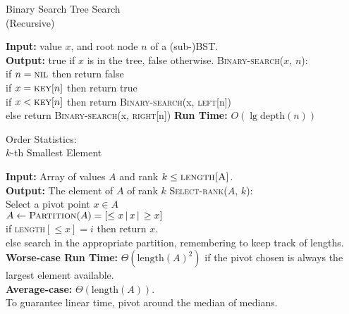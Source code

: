 \documentclass[avery5388, grid]{flashcards}
\begin{document}
\makeatletter
\renewcommand*\env@matrix[1][c]{\hskip -\arraycolsep
  \let\@ifnextchar\new@ifnextchar
  \array{*\c@MaxMatrixCols #1}}
\makeatother


\begin{flashcard}{Binary Search Tree Search\\(Recursive)}
\begin{flushleft}
\textsf{\textbf{Input:}} value $x$, and root node $n$ of a (sub-)BST.\\
\textsf{\textbf{Output:}} \textsf{true} if $x$ is in the tree, \textsf{false} otherwise.
\vskip 5pt
\textsc{Binary-search}($x$, $n$):\\
\quad if $n=\textsc{nil}$ then return \textsf{false}\\
\quad if $x=\textsc{key}[n]$ then return \textsf{true}\\
\quad if $x < \textsc{key}[n]$ then return \textsc{Binary-search}(x, \textsc{left}[n])\\
\quad else return \textsc{Binary-search}(x, \textsc{right}[n])
\vskip 5pt
\textsf{\textbf{Run Time:}} $O(\lg\mathrm{depth}(n))$
\end{flushleft}
\end{flashcard}

\begin{flashcard}{Order Statistics:\\ $k$-th Smallest Element}
\begin{flushleft}
\textsf{\textbf{Input:}} Array of values $A$ and rank $k \leq \textsc{length[A]}$.\\
\textsf{\textbf{Output:}} The element of $A$ of rank $k$
\vskip 5pt
\textsc{Select-rank}($A$, $k$):\\
\quad Select a pivot point $x \in A$\\
\quad $A \gets \textsc{Partition}(A) = [\leq x\, |\, x \,|\, \geq x]$\\
\quad if \textsc{length}$[\leq x] = i$ then return $x$.\\
\quad else search in the appropriate partition, remembering to keep track of lengths.
\vskip 5pt
\textsf{\textbf{Worse-case Run Time:}} $\Theta(\mathrm{length}(A)^2)$ if the pivot chosen is always the largest element available.\\
\textsf{\textbf{Average-case:}} $\Theta(\mathrm{length}(A))$.\\
\vskip 5pt
To guarantee linear time, pivot around the median of medians.
\end{flushleft}
\end{flashcard}
\end{document}
